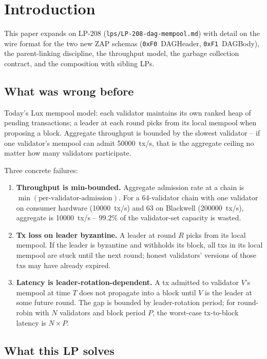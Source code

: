 \section{Introduction}

This paper expands on LP-208 (\texttt{lps/LP-208-dag-mempool.md})
with detail on the wire format for the two new ZAP schemas
(\texttt{0xF0}~DAGHeader, \texttt{0xF1}~DAGBody), the parent-linking
discipline, the throughput model, the garbage collection contract,
and the composition with sibling LPs.

\subsection{What was wrong before}

Today's Lux mempool model: each validator maintains its own ranked
heap of pending transactions; a leader at each round picks from its
local mempool when proposing a block. Aggregate throughput is
bounded by the slowest validator -- if one validator's mempool can
admit \SI{50000}{tx/s}, that is the aggregate ceiling no matter how
many validators participate.

Three concrete failures:

\begin{enumerate}[leftmargin=2em,nosep]
\item \textbf{Throughput is min-bounded.} Aggregate admission rate at
  a chain is $\min(\textrm{per-validator-admission})$. For a 64-validator
  chain with one validator on consumer hardware
  (\SI{10000}{tx/s}) and 63 on Blackwell (\SI{200000}{tx/s}),
  aggregate is \SI{10000}{tx/s} -- $99.2\%$ of the validator-set
  capacity is wasted.
\item \textbf{Tx loss on leader byzantine.} A leader at round $R$
  picks from its local mempool. If the leader is byzantine and
  withholds its block, all txs in its local mempool are stuck until
  the next round; honest validators' versions of those txs may have
  already expired.
\item \textbf{Latency is leader-rotation-dependent.} A tx admitted
  to validator $V$'s mempool at time $T$ does not propagate into a
  block until $V$ is the leader at some future round. The gap is
  bounded by leader-rotation period; for round-robin with $N$
  validators and block period $P$, the worst-case tx-to-block
  latency is $N \times P$.
\end{enumerate}

\subsection{What this LP solves}


